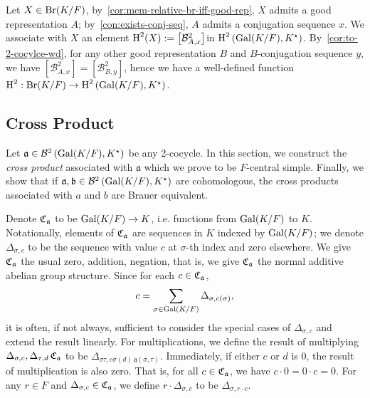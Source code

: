 \begin{construction}\label{con:br-to-snd-coh}
  Let $X \in \operatorname{Br}(K/F)$, by~\cref{cor:mem-relative-br-iff-good-rep}, $X$ admits a good representation $A$; by~\cref{con:exists-conj-seq}, $A$ admits a conjugation sequence $x$. We associate with $X$ an element $\operatorname{H}^{2}(X) := \left[\mathcal{B}^{2}_{A,x}\right]$in $\operatorname{H}^{2}\left(\operatorname{Gal}(K/F),K^{\star}\right)$. By~\cref{cor:to-2-cocylce-wd}, for any other good representation $B$ and $B$-conjugation sequence $y$, we have $\left[\mathcal{B}^{2}_{A,x}\right]=\left[\mathcal{B}^{2}_{B,y}\right]$, hence we have a well-defined function $\operatorname{H}^{2} : \operatorname{Br}(K/F) \to \operatorname{H}^{2}\left(\operatorname{Gal}(K/F),K^{\star}\right)$.
  \leanok
\end{construction}

\subsection{Cross Product}

Let $\mathfrak{a} \in \mathcal{B}^{2}\left(\operatorname{Gal}(K/F), K^{\star}\right)$ be any 2-cocycle. In this section, we construct the {\em cross product\/} associated with $\mathfrak{a}$ which we prove to be $F$-central simple. Finally, we show that if $\mathfrak{a}, \mathfrak{b}\in\mathcal{B}^{2}\left(\operatorname{Gal}(K/F), K^{\star}\right)$ are cohomologous, the cross products associated with $a$ and $b$ are Brauer equivalent.

\begin{construction}\label{con:cross-product}
  Denote $\operatorname{\mathfrak{C}}_{\mathfrak{a}}$ to be $\operatorname{Gal}(K/F) \to K$, i.e. functions from $\operatorname{Gal}(K/F)$ to $K$. Notationally, elements of $\operatorname{\mathfrak{C}}_{\mathfrak{a}}$ are sequences in $K$ indexed by $\operatorname{Gal}(K/F)$; we denote $\Delta_{\sigma, c}$ to be the sequence with value $c$ at $\sigma$-th index and zero elsewhere. We give $\operatorname{\mathfrak{C}}_{\mathfrak{a}}$ the usual zero, addition, negation, that is, we give $\operatorname{\mathfrak{C}}_{\mathfrak{a}}$ the normal additive abelian group structure. Since for each $c \in \operatorname{\mathfrak{C}}_{\mathfrak{a}}$,
  \[
    c = \sum_{\sigma\in\operatorname{Gal}(K/F)}\Delta_{\sigma, c(\sigma)},
    \]
    it is often, if not always, sufficient to consider the special cases of $\Delta_{\sigma, c}$ and extend the result linearly.
  For multiplications, we define the result of multiplying $\Delta_{\sigma, c},\Delta_{\tau, d} \operatorname{\mathfrak{C}}_{\mathfrak{a}}$ to be $\Delta_{\sigma\tau, c\sigma(d)\, \mathfrak{a}(\sigma,\tau)}$. Immediately, if either $c$ or $d$ is $0$, the result of multiplication is also zero. That is, for all $c \in \operatorname{\mathfrak{C}}_{\mathfrak{a}}$, we have $c\cdot 0=0\cdot c =0$. For any $r \in F$ and $\Delta_{\sigma, c} \in \operatorname{\mathfrak{C}}_{\mathfrak{a}}$, we define $r \cdot \Delta_{\sigma, c}$ to be $\Delta_{\sigma, r\cdot c}$.
  \leanok
\end{construction}

